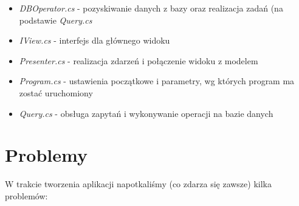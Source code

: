 \documentclass{article}
\begin{document}
\begin{itemize}
    \item \textit{DBOperator.cs} - pozyskiwanie danych z bazy oraz realizacja zadań (na podstawie \textit{Query.cs}
    \item \textit{IView.cs} - interfejs dla głównego widoku
    \item \textit{Presenter.cs} - realizacja zdarzeń i połączenie widoku z modelem
    \item \textit{Program.cs} - ustawienia początkowe i parametry, wg których program ma zostać uruchomiony
    \item \textit{Query.cs} - obsługa zapytań i wykonywanie operacji na bazie danych
\end{itemize}

\newpage
\section{Problemy}
W trakcie tworzenia aplikacji napotkaliśmy (co zdarza się zawsze) kilka problemów:
\end{document}

